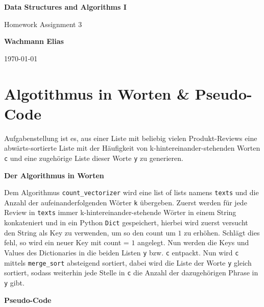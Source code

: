 \documentclass[ngerman]{scrartcl}
\newcommand{\code}{\texttt}
\begin{document}
\begin{titlepage}
    \begin{center}
        \vspace{1cm}
        \Huge
        \textbf{Data Structures and Algorithms I}
        \vspace{5mm}

        \Large
        Homework Assignment 3
        \vspace{5mm}


        \textbf{Wachmann Elias}


        \today
    \end{center}
\end{titlepage}

\clearpage
\tableofcontents
\newpage

\section{Algotithmus in Worten \& Pseudo-Code}
\label{sec:pseudo_code}
Aufgabenstellung ist es, aus einer Liste mit beliebig vielen Produkt-Reviews eine abwärts-sortierte Liste mit der Häufigkeit von k-hintereinander-stehenden Worten \code{c} und eine zugehörige Liste dieser Worte \code{y} zu generieren. 

\textbf{Der Algorithmus in Worten}

Dem Algorithmus \code{count\_vectorizer} wird eine list of lists namens \code{texts} und die Anzahl der aufeinanderfolgenden Wörter \code{k} übergeben.
Zuerst werden für jede Review in \code{texts} immer k-hintereinander-stehende Wörter in einem String konkateniert und in ein Python \code{Dict} gespeichert, hierbei wird zuerst versucht den String als Key zu verwenden, um so den count um $1$ zu erhöhen. Schlägt dies fehl, so wird ein neuer Key mit count = $1$ angelegt. Nun werden die Keys und Values des Dictionaries in die beiden Listen \code{y} bzw. \code{c} entpackt. Nun wird \code{c} mittels \code{merge\_sort} absteigend sortiert, dabei wird die Liste der Worte \code{y} gleich sortiert, sodass weiterhin jede Stelle in \code{c} die Anzahl der dazugehörigen Phrase in \code{y} gibt.

\textbf{Pseudo-Code}
\end{document}

